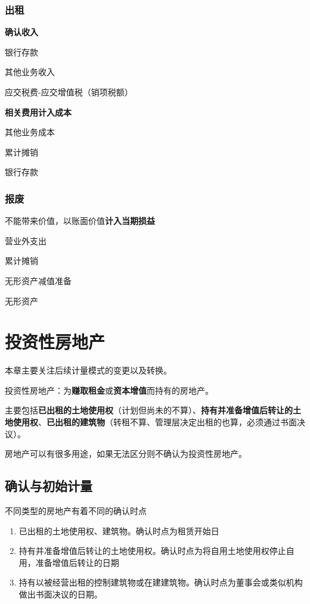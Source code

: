 \documentclass[UTF8,12pt]{ctexart}
\newenvironment{Dr}{%
	\begin{list}{}%
		{
			\setlength{\leftmargin}{2em}
			\setlength{\labelwidth}{2em}
			\setlength{\labelsep}{0pt}
			\setlength{\itemindent}{0pt}
			\setlength{\listparindent}{0pt}
			\setlength{\parsep}{0pt}
			\setlength{\topsep}{0pt}
		}
		\item[\textbf{借：}]
	}{%
	\end{list}
}
\newenvironment{Cr}{%
	\begin{list}{}%
		{
			\setlength{\leftmargin}{2em}
			\setlength{\labelwidth}{2em}
			\setlength{\labelsep}{0pt}
			\setlength{\itemindent}{0pt}
			\setlength{\listparindent}{0pt}
			\setlength{\parsep}{0pt}
			\setlength{\topsep}{0pt}
		}
		\item[\textbf{贷：}]
	}{%
	\end{list}
}
\numberwithin{equation}{section} %
\numberwithin{figure}{section}
\numberwithin{table}{section}
\begin{document}
	\subsubsection{出租}
	
	\textbf{确认收入}
	
	\begin{Dr}
		银行存款
	\end{Dr}
	\begin{Cr}
		其他业务收入
		
		应交税费-应交增值税（销项税额）
	\end{Cr}

	
	\textbf{相关费用计入成本}
	
	\begin{Dr}
		其他业务成本
	\end{Dr}
	\begin{Cr}
		累计摊销
		
		银行存款
	\end{Cr}
	
	
	\subsubsection{报废}
	
	不能带来价值，以账面价值\textbf{计入当期损益}
	
	\begin{Dr}
		营业外支出
		
		累计摊销
		
		无形资产减值准备
	\end{Dr}
	\begin{Cr}
		无形资产
	\end{Cr}

	
	\newpage
	\section{投资性房地产}
	
	本章主要关注后续计量模式的变更以及转换。
	
	投资性房地产：为\textbf{赚取租金}或\textbf{资本增值}而持有的房地产。
	
	主要包括\textbf{已出租的土地使用权}（计划但尚未的不算）、\textbf{持有并准备增值后转让的土地使用权}、\textbf{已出租的建筑物}（转租不算、管理层决定出租的也算，必须通过书面决议）。
	
	房地产可以有很多用途，如果无法区分则不确认为投资性房地产。
	
	\subsection{确认与初始计量}
	不同类型的房地产有着不同的确认时点
	\begin{enumerate}
		\item 已出租的土地使用权、建筑物。确认时点为租赁开始日
		
		\item 持有并准备增值后转让的土地使用权。确认时点为将自用土地使用权停止自用，准备增值后转让的日期
		
		\item 持有以被经营出租的控制建筑物或在建建筑物。确认时点为董事会或类似机构做出书面决议的日期。
	\end{enumerate}
	
\end{document}
